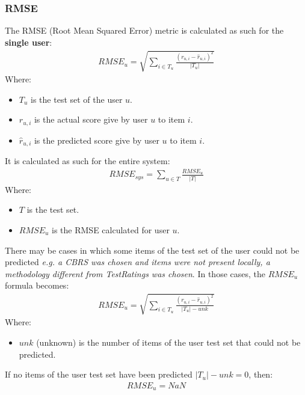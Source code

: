 \documentclass[11pt]{article}
\begin{document}
\subsubsection{RMSE}\label{subsubsec:rmse}
The RMSE (Root Mean Squared Error) metric is calculated as such for the \textbf{single user}:
\hfill\break
\hfill\break
    \[
       \begin{gathered}
           RMSE_u = \sqrt{\sum_{i \in T_u} \frac{(r_{u,i} - \hat{r}_{u,i})^2}{|T_u|}}
       \end{gathered}
    \]
\hfill\break
\hfill\break
    Where:
\begin{itemize}
    \item $T_u$ is the test set of the user $u$.
    \item $r_{u, i}$ is the actual score give by user $u$ to item $i$.
    \item $\hat{r}_{u, i}$ is the predicted score give by user $u$ to item $i$.
\end{itemize}
\hfill\break
\hfill\break
It is calculated as such for the entire system:
\hfill\break
\hfill\break
    \[
      \begin{gathered}
          RMSE_{sys} = \sum_{u \in T} \frac{RMSE_u}{|T|}
      \end{gathered}
    \]
\hfill\break
\hfill\break
    Where:
\begin{itemize}
    \item $T$ is the test set.
    \item $RMSE_u$ is the RMSE calculated for user $u$.
\end{itemize}
\hfill\break
\hfill\break
There may be cases in which some items of the test set of the user could not be predicted
\textit{e.g. a CBRS was chosen and items were not present locally, a methodology different from TestRatings was chosen}.
In those cases, the $RMSE_u$ formula becomes:
\hfill\break
\hfill\break
    \[
       \begin{gathered}
           RMSE_u = \sqrt{\sum_{i \in T_u} \frac{(r_{u,i} - \hat{r}_{u,i})^2}{|T_u| - unk}}
       \end{gathered}
    \]
\hfill\break
\hfill\break
    Where:
\begin{itemize}
    \item $unk$ (unknown) is the number of items of the user test set that could not be predicted.
\end{itemize}
\hfill\break
\hfill\break
If no items of the user test set have been predicted $|T_u| - unk = 0$, then:
\hfill\break
\hfill\break
    \[
      \begin{gathered}
          RMSE_u = NaN
      \end{gathered}
    \]
\hfill\break
\hfill\break
\end{document}
